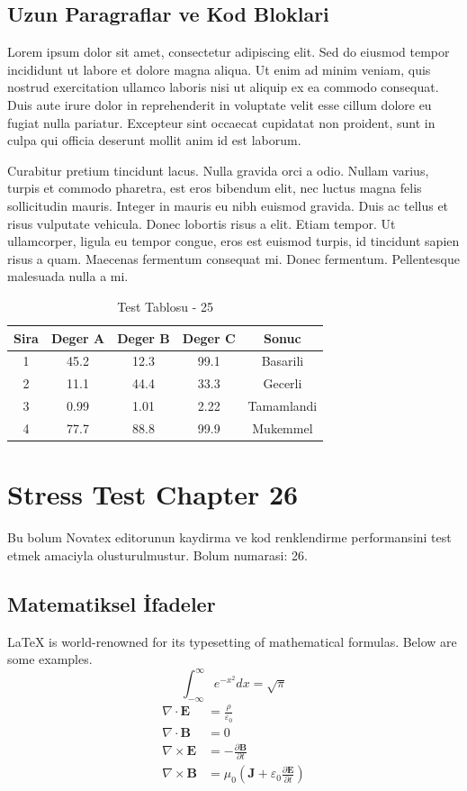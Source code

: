 \documentclass[12pt,a4paper]{article}
\begin{document}
\subsection{Uzun Paragraflar ve Kod Bloklari}
Lorem ipsum dolor sit amet, consectetur adipiscing elit. Sed do eiusmod tempor incididunt ut labore et dolore magna aliqua. Ut enim ad minim veniam, quis nostrud exercitation ullamco laboris nisi ut aliquip ex ea commodo consequat. Duis aute irure dolor in reprehenderit in voluptate velit esse cillum dolore eu fugiat nulla pariatur. Excepteur sint occaecat cupidatat non proident, sunt in culpa qui officia deserunt mollit anim id est laborum.

Curabitur pretium tincidunt lacus. Nulla gravida orci a odio. Nullam varius, turpis et commodo pharetra, est eros bibendum elit, nec luctus magna felis sollicitudin mauris. Integer in mauris eu nibh euismod gravida. Duis ac tellus et risus vulputate vehicula. Donec lobortis risus a elit. Etiam tempor. Ut ullamcorper, ligula eu tempor congue, eros est euismod turpis, id tincidunt sapien risus a quam. Maecenas fermentum consequat mi. Donec fermentum. Pellentesque malesuada nulla a mi.

\begin{table}[h!]
\centering
\begin{tabular}{|c|c|c|c|c|}
\hline
\textbf{Sira} & \textbf{Deger A} & \textbf{Deger B} & \textbf{Deger C} & \textbf{Sonuc} \\
\hline
1 & 45.2 & 12.3 & 99.1 & Basarili \\
2 & 11.1 & 44.4 & 33.3 & Gecerli \\
3 & 0.99 & 1.01 & 2.22 & Tamamlandi \\
4 & 77.7 & 88.8 & 99.9 & Mukemmel \\
\hline
\end{tabular}
\caption{Test Tablosu - 25}
\end{table}

\newpage
\section{Stress Test Chapter 26}
Bu bolum Novatex editorunun kaydirma ve kod renklendirme performansini test etmek amaciyla olusturulmustur. Bolum numarasi: 26.

\subsection{Matematiksel İfadeler}
\LaTeX{} is world-renowned for its typesetting of mathematical formulas. Below are some examples.
\begin{equation}
\int_{-\infty}^{\infty} e^{-x^2} dx = \sqrt{\pi}
\end{equation}
\begin{align}
\nabla \cdot \mathbf{E} &= \frac{\rho}{\varepsilon_0} \\
\nabla \cdot \mathbf{B} &= 0 \\
\nabla \times \mathbf{E} &= -\frac{\partial \mathbf{B}}{\partial t} \\
\nabla \times \mathbf{B} &= \mu_0\left(\mathbf{J} + \varepsilon_0 \frac{\partial \mathbf{E}}{\partial t}\right)
\end{align}
\end{document}
